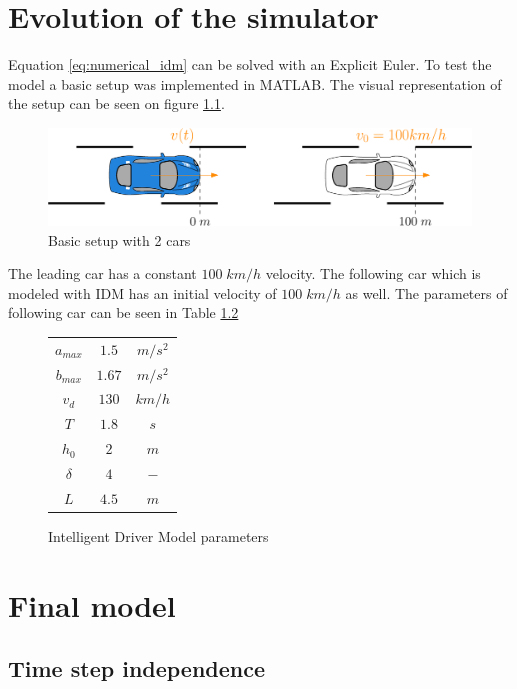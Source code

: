 \documentclass[a4paper,11pt,twoside]{report}
\begin{document}
	\chapter{Evolution of the simulator}
			Equation \ref{eq:numerical_idm} can be solved with an Explicit Euler. To test the model a basic setup was implemented in MATLAB. The visual representation of the setup can be seen on figure \ref{fig:basic2car}.
			\begin{figure}[ht]
				\centering
				\includegraphics[width=\textwidth]{basic_2_car.eps}
				\caption{Basic setup with 2 cars}
				\label{fig:basic2car}
			\end{figure}
			The leading car has a constant $100\;km/h$ velocity. The following car which is modeled with IDM has an initial velocity of $100\;km/h$ as well. The parameters of following car can be seen in Table \ref{table:idm_params}
			\begin{figure}[ht]
				\begin{center}
					\begin{tabular}{ |c|c|c| } 
						\hline
						$a_{max}$ & $1.5$ & $m/s^2$ \\
						$b_{max}$ & $1.67$ & $m/s^2$ \\
						$v_d$ & $130$ & $km/h$ \\
						$T$ & $1.8$ & $s$ \\
						$h_0$ & $2$ & $m$ \\
						$\delta$ & $4$ & $-$ \\
						$L$ & $4.5$ & $m$ \\
						\hline
					\end{tabular}
				\end{center}
				\caption{Intelligent Driver Model parameters}
				\label{table:idm_params}
			\end{figure}
	\chapter{Final model}
		\section{Time step independence}
\end{document}
